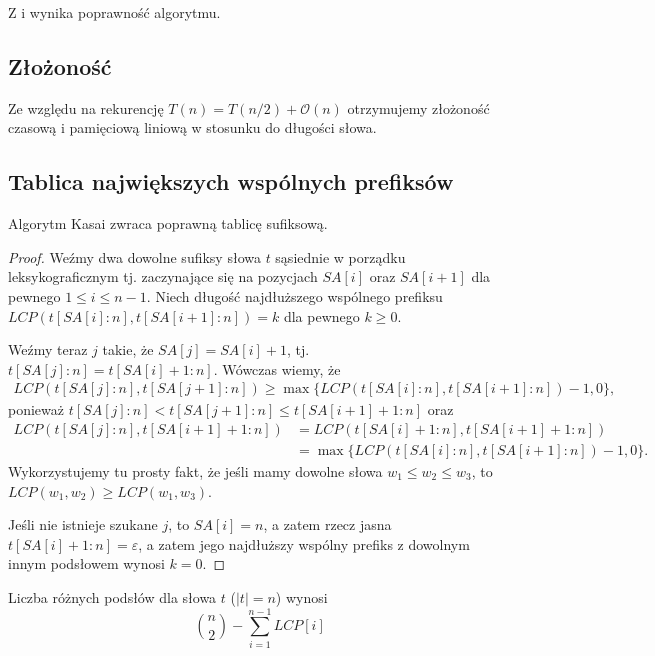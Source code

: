 Z  i  wynika poprawność algorytmu.


\subsection{Złożoność}
Ze względu na rekurencję $T(n) = T(n/2) + \mathcal{O}(n)$ otrzymujemy złożoność czasową i pamięciową liniową w stosunku do długości słowa.


\subsection{Tablica największych wspólnych prefiksów}


\begin{theorem}{}{}
  Algorytm Kasai zwraca poprawną tablicę sufiksową.
\end{theorem}

\begin{proof}{}{}
  Weźmy dwa dowolne sufiksy słowa $t$ sąsiednie w porządku leksykograficznym tj. zaczynające się na pozycjach $SA[i]$ oraz $SA[i + 1]$ dla pewnego $1 \le i \le n - 1$. Niech długość najdłuższego wspólnego prefiksu $LCP(t[SA[i]:n], t[SA[i + 1]:n]) = k$ dla pewnego $k \ge 0$.

  Weźmy teraz $j$ takie, że $SA[j] = SA[i] + 1$, tj. $t[SA[j]:n] = t[SA[i] + 1:n]$. Wówczas wiemy, że
  \begin{align*}
    LCP(t[SA[j]:n], t[SA[j + 1]:n]) \ge \max\{LCP(t[SA[i]:n], t[SA[i + 1]:n]) - 1, 0\},
  \end{align*}
  ponieważ $t[SA[j]:n] < t[SA[j + 1]:n] \le t[SA[i + 1] + 1:n]$
  oraz
  \begin{align*}
    LCP(t[SA[j]:n], t[SA[i + 1] + 1:n])
        & = LCP(t[SA[i] + 1:n], t[SA[i + 1] + 1:n]) \\
        & = \max\{LCP(t[SA[i]:n], t[SA[i + 1]:n]) - 1, 0\}.
  \end{align*}
  Wykorzystujemy tu prosty fakt, że jeśli mamy dowolne słowa $w_1 \le w_2 \le w_3$, to $LCP(w_1, w_2) \ge LCP(w_1, w_3)$.

  Jeśli nie istnieje szukane $j$, to $SA[i] = n$, a zatem rzecz jasna $t[SA[i] + 1:n] = \varepsilon$, a zatem jego najdłuższy wspólny prefiks z dowolnym innym podsłowem wynosi $k = 0$.
\end{proof}

\begin{theorem}{}{}
  Liczba różnych podsłów dla słowa $t$ ($|t| = n$) wynosi
  \begin{equation*}
    \binom{n}{2} - \sum_{i = 1}^{n - 1} LCP[i]
  \end{equation*}
\end{theorem}

